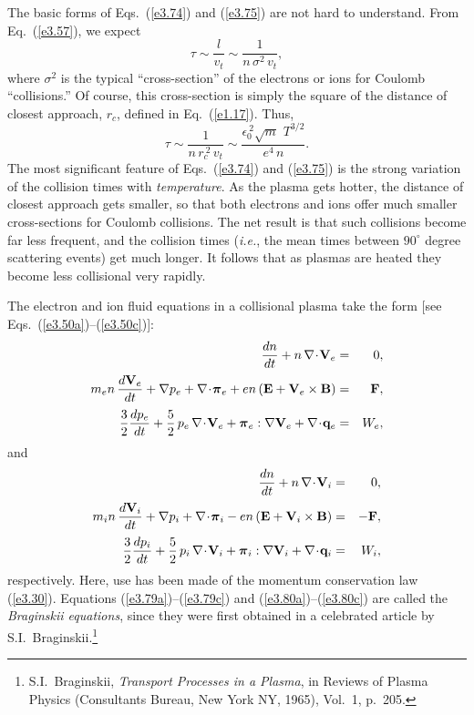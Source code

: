 The basic forms of Eqs.~(\ref{e3.74}) and (\ref{e3.75}) are not hard to understand.
From Eq.~(\ref{e3.57}), we expect
\begin{equation}
\tau \sim \frac{l}{v_t} \sim \frac{1}{n\,\sigma^2\,v_t},
\end{equation}
where $\sigma^2$ is the typical ``cross-section'' of the electrons or ions for
Coulomb ``collisions.'' Of course, this cross-section is simply the square of
the distance
of closest approach, $r_c$, defined in Eq.~(\ref{e1.17}). Thus,
\begin{equation}
\tau \sim \frac{1}{n\,r_c^{~2}\,v_t} \sim \frac{\epsilon_0^{~2}\sqrt{m}\,\,T^{3/2}}
{e^4\,n}.
\end{equation}
The most significant feature of Eqs.~(\ref{e3.74}) and (\ref{e3.75}) is the strong variation of
the collision times with {\em temperature}. As the plasma gets hotter, the
distance of closest approach gets smaller, so that both electrons and
ions offer  much smaller cross-sections for Coulomb collisions. The net
result is that such collisions become far  less frequent, and the collision
times ({\em i.e.}, the mean times between $90^\circ$ degree scattering
events) get much  longer. It follows that as plasmas are heated they become
less collisional very rapidly. 

The electron and ion fluid equations in a collisional plasma
take the form [see Eqs.~(\ref{e3.50a})--(\ref{e3.50c})]:
\begin{eqnarray}\label{e3.79a}
\frac{dn}{dt} + n\,\nabla\!\cdot\!{\bf V}_e &=& 0,\\[0.5ex]
m_e n\,\frac{d {\bf V}_e}{dt} + \nabla p_e+ \nabla\!\cdot \!\bpi_e + e n\,
({\bf E} + {\bf V}_e\times {\bf B})& =& {\bf F},\\[0.5ex]
\frac{3}{2}\frac{d p_e}{dt} + \frac{5}{2}\,p_e\,\nabla\!\cdot\!{\bf V}_e
+ \bpi_e:\nabla{\bf V}_e+ \nabla\!\cdot\!{\bf q}_e &=& W_e,\label{e3.79c}
\end{eqnarray}
and
\begin{eqnarray}\label{e3.80a}
\frac{dn}{dt} + n\,\nabla\!\cdot\!{\bf V}_i &=& 0,\\[0.5ex]
m_i n\,\frac{d {\bf V}_i}{dt} + \nabla p_i + \nabla\!\cdot \!\bpi_i - e n\,
({\bf E} + {\bf V}_i\times {\bf B})& =&- {\bf F},\\[0.5ex]
\frac{3}{2}\frac{d p_i}{dt} + \frac{5}{2}\,p_i\,\nabla\!\cdot\!{\bf V}_i
+ \bpi_i:\nabla{\bf V}_i+ \nabla\!\cdot\!{\bf q}_i &=& W_i,\label{e3.80c}
\end{eqnarray}
respectively. Here, use has been made of the momentum conservation law (\ref{e3.30}). 
Equations (\ref{e3.79a})--(\ref{e3.79c}) and (\ref{e3.80a})--(\ref{e3.80c})  are called the {\em Braginskii equations}, since they were first obtained
in a celebrated article by S.I.~Braginskii.\footnote{S.I.~Braginskii,
{\em Transport Processes in a Plasma}, in {\sf Reviews of Plasma Physics}
(Consultants Bureau, New York NY, 1965), Vol.~1, p.~205.}

